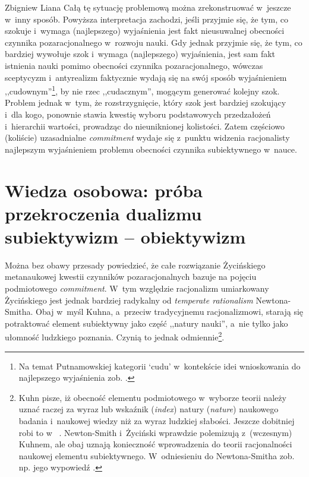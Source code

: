 \begin{artplenv}{Zbigniew Liana}
Całą tę sytuację problemową można zrekonstruować w~jeszcze w~inny sposób. Powyższa interpretacja zachodzi, jeśli przyjmie się, że tym, co szokuje i~wymaga (najlepszego) wyjaśnienia jest fakt nieusuwalnej obecności czynnika pozaracjonalnego w~rozwoju nauki. Gdy jednak przyjmie się, że tym, co bardziej wywołuje szok i~wymaga (najlepszego) wyjaśnienia, jest sam fakt istnienia nauki pomimo obecności czynnika pozaracjonalnego, wówczas sceptycyzm i~antyrealizm faktycznie wydają się na swój sposób wyjaśnieniem ,,cudownym''\footnote{Na temat Putnamowskiej kategorii ‘cudu' w~kontekście idei wnioskowania do najlepszego wyjaśnienia zob.
\parencites[][s.~70n]{psillos_scientific_1999}[][s.~265]{grobler_metodologia_2006}[][s.~133]{liana_naturalistyczne_2003}.%
}, by nie rzec ,,cudacznym'', mogącym generować kolejny szok. Problem jednak w~tym, że rozstrzygnięcie, który szok jest bardziej szokujący i~dla kogo, ponownie stawia kwestię wyboru podstawowych przedzałożeń i~hierarchii wartości, prowadząc do nieuniknionej kolistości. Zatem częściowo (koliście) uzasadnialne \textit{commitment} wydaje się z~punktu widzenia racjonalisty najlepszym wyjaśnieniem problemu obecności czynnika subiektywnego w~nauce.

\section{Wiedza osobowa: próba przekroczenia dualizmu subiektywizm -- obiektywizm}
Można bez obawy przesady powiedzieć, że całe rozwiązanie Życińskiego metanaukowej kwestii czynników pozaracjonalnych bazuje na pojęciu podmiotowego \textit{commitment}. W~tym względzie racjonalizm umiarkowany Życińskiego jest jednak bardziej radykalny od \textit{temperate rationalism} Newtona-Smitha. Obaj w~myśl Kuhna, a~przeciw tradycyjnemu racjonalizmowi, starają się potraktować element subiektywny jako część ,,natury nauki'', a~nie tylko jako ułomność ludzkiego poznania. Czynią to jednak odmiennie\footnote{Kuhn
\parencites*[][s.~151]{kuhn_structure_1970_liana}[por.][s.~263]{kuhn_struktura_2001} %
 pisze, iż obecność elementu podmiotowego w~wyborze teorii należy uznać raczej za wyraz lub wskaźnik (\textit{index}) natury (\textit{nature}) naukowego badania i~naukowej wiedzy niż za wyraz ludzkiej słabości. Jeszcze dobitniej robi to w~
\parencites[][s.~325n]{kuhn_objectivity_1977}[por.][s.~447]{kuhn_obiektywnosc_1985}. %
 Newton-Smith i~Życiński wprawdzie polemizują z~(wczesnym) Kuhnem, ale obaj uznają konieczność wprowadzenia do teorii racjonalności naukowej elementu subiektywnego. W~odniesieniu do Newtona-Smitha zob. np. jego wypowiedź 
\parencite[][s.~270]{newton-smith_rationality_1981}.%
}.


\end{artplenv}
